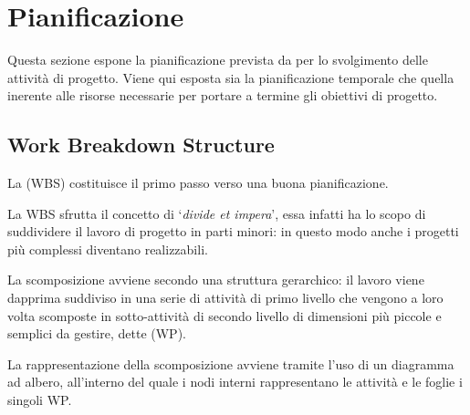 

\section{Pianificazione}
Questa sezione espone la pianificazione prevista da \team per lo svolgimento delle attività di progetto. Viene qui esposta sia la pianificazione temporale che quella inerente alle risorse necessarie per portare a termine gli obiettivi di progetto.

\subsection{Work Breakdown Structure}

La  (WBS) costituisce il primo passo verso una buona pianificazione.

La WBS sfrutta il concetto di `\textit{divide et impera}', essa infatti ha lo scopo di suddividere il lavoro di progetto in parti minori: in questo modo anche i progetti più complessi diventano realizzabili.

La scomposizione avviene secondo una struttura gerarchico: il lavoro viene dapprima suddiviso in una serie di attività di primo livello che vengono a loro volta scomposte in sotto-attività di secondo livello di dimensioni più piccole e semplici da gestire, dette  (WP).

La rappresentazione della scomposizione avviene tramite l'uso di un diagramma ad albero, all'interno del quale i nodi interni rappresentano le attività e le foglie i singoli WP\@.

